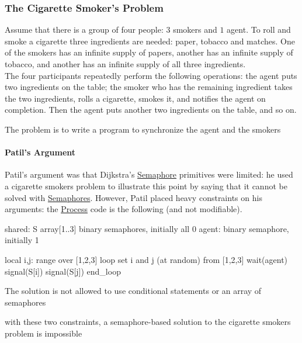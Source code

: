 \subsubsection{The Cigarette Smoker's Problem}\label{sub:pi_the_cigarette_smoker_s_problem} %
Assume that there is a group of four people: $3$ smokers and $1$ agent.
To roll and smoke a cigarette three ingredients are needed: paper, tobacco and matches.
One of the smokers has an infinite supply of papers, another has an infinite supply of tobacco, and another has an infinite supply of all three ingredients.
\\
The four participants repeatedly perform the following operations: the agent puts two ingredients on the table; the smoker who has the remaining ingredient takes the two ingredients, rolls a cigarette, smokes it, and notifies the agent on completion.
Then the agent puts another two ingredients on the table, and so on.
\begin{note}
    The problem is to write a program to synchronize the agent and the smokers
\end{note}
%
\paragraph{Patil's Argument}\label{par:patil_s_argument} %
Patil's argument was that Dijkstra's \hyperref[def:semaphore]{Semaphore} primitives were limited: he used a cigarette smokers problem to illustrate this point by saying that it cannot be solved with \hyperref[def:semaphore]{Semaphores}.
However, Patil placed heavy constraints on his arguments: the \hyperref[def:process]{Process} code is the following (and not modifiable).
\begin{codeblock}{}
    shared: S array[1..3] binary semaphores, initially all 0
    agent: binary semaphore, initially 1

    local i,j: range over [1,2,3]
    loop
        set i and j (at random) from [1,2,3]
        wait(agent)
        signal(S[i])
        signal(S[j])
    end_loop
\end{codeblock}
\begin{note}
    The solution is not allowed to use conditional statements or an array of semaphores
\end{note}
\begin{warning}
    with these two constraints, a semaphore-based solution to the cigarette smokers problem is impossible
\end{warning}
%
